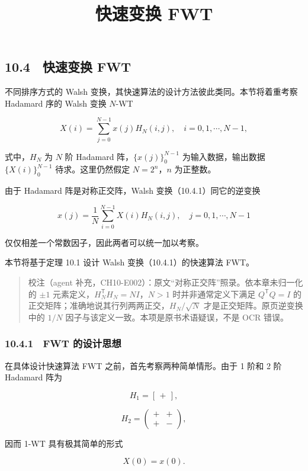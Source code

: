 \documentclass[
  10pt,
  fontset=fandol]{ctexart}
\title{快速变换 FWT}
\author{}
\date{}
\begin{document}
\maketitle

\subsection{10.4　快速变换 FWT}\label{ux5febux901fux53d8ux6362-fwt}

不同排序方式的 Walsh 变换，其快速算法的设计方法彼此类同。本节将着重考察 Hadamard 序的 Walsh 变换 \(N\)-WT

\[
X(i)=\sum_{j=0}^{N-1}x(j)H_N(i,j),\quad i=0,1,\cdots,N-1,
\tag{10.4.1}
\]

式中，\(H_N\) 为 \(N\) 阶 Hadamard 阵，\(\{x(j)\}_0^{N-1}\) 为输入数据，输出数据 \(\{X(i)\}_0^{N-1}\) 待求。这里仍然假定 \(N=2^n\)，\(n\) 为正整数。

由于 Hadamard 阵是对称正交阵，Walsh 变换（10.4.1）同它的逆变换

\[
x(j)=\frac1N\sum_{i=0}^{N-1}X(i)H_N(i,j),\quad j=0,1,\cdots,N-1
\]

仅仅相差一个常数因子，因此两者可以统一加以考察。

本节将基于定理 10.1 设计 Walsh 变换（10.4.1）的快速算法 FWT。

\begin{quote}
校注（agent 补充，CH10-E002）：原文``对称正交阵''照录。依本章未归一化的 \(\pm1\) 元素定义，\(H_N^\mathsf{T}H_N=NI\)，\(N>1\) 时并非通常定义下满足 \(Q^\mathsf{T}Q=I\) 的正交矩阵；准确地说其行列两两正交，\(H_N/\sqrt N\) 才是正交矩阵。原页逆变换中的 \(1/N\) 因子与该定义一致。本项是原书术语疑误，不是 OCR 错误。
\end{quote}

\subsubsection{10.4.1　FWT 的设计思想}\label{fwt-ux7684ux8bbeux8ba1ux601dux60f3}

在具体设计快速算法 FWT 之前，首先考察两种简单情形。由于 1 阶和 2 阶 Hadamard 阵为

\[
H_1=[\,+\,],
\]

\[
H_2=\begin{pmatrix}+&+\\+&-\end{pmatrix},
\]

因而 1-WT 具有极其简单的形式

\[
X(0)=x(0).
\]
\end{document}
